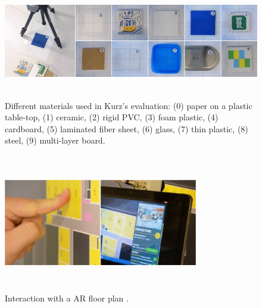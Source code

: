 \documentclass{sig-alternate}
\begin{document}
\begin{figure}
	\includegraphics[width=18cm, height=5cm]{ThermalTesting}
	\caption{Different materials used in Kurz's evaluation: (0) paper on a plastic table-top, (1) ceramic, (2) rigid PVC, (3) foam plastic, (4) cardboard, (5) laminated fiber sheet, (6) glass, (7) thin plastic, (8) steel, (9) multi-layer board. \cite{Thermal}}
	\label{fig:ThermalTest}
\end{figure}

\begin{figure}
	\includegraphics[width=8.5cm, height=6cm]{AugmentedFloorPlans}
	\caption{Interaction with a AR floor plan \cite{Thermal}.}
	\label{fig:FloorPlan}
\end{figure}
\end{document}
